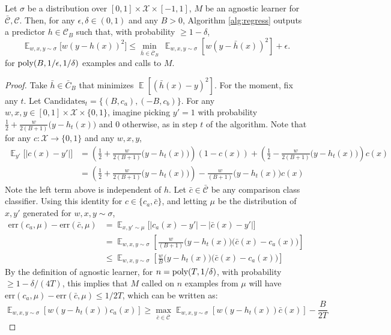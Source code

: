 \documentclass[final, 12pt]{colt2018} %
\newcommand{\eps}{\epsilon}
\newcommand{\E}{\mathop{\mathbb{E}}}
\newcommand{\err}{\mathrm{err}}
\def\calC{\mathcal{C}}
\def\calX{\mathcal{X}}
\newcommand{\poly}{\mathop{\mbox{\text{poly}}}}
\begin{document}
\begin{lemma}\label{lem:classification-to-regression}
Let $\sigma$ be a distribution over $[0,1]\times \calX \times [-1,1]$, $M$ be an agnostic learner for $\bar{\calC}, \calC$.
Then,  for any $\eps, \delta \in (0,1)$ and any $B>0$, Algorithm \ref{alg:regress} outputs a predictor $h \in \calC_B$ such that, with probability $\geq 1-\delta$, 
$$\E_{w,x,y\sim \sigma}\bigl[w(y-h(x))^2\bigr] \leq \min_{\bar{h} \in \bar{\calC}_B} ~\E_{w,x,y\sim \sigma}\left[w\left(y-\bar{h}(x)\right)^2\right]+\eps.$$
for $\poly(B, 1/\eps, 1/\delta)$ examples and calls to $M$.
\end{lemma}
\begin{proof}
Take $\bar{h}\in \bar{C}_B$ that minimizes $\E[(\bar{h}(x)-y)^2]$. 
For the moment, fix any $t$. Let $\mathrm{Candidates}_t=\{(B,c_a), (-B,c_b)\}$. For any $w,x,y\in [0,1] \times \calX \times\{0,1\}$, imagine picking $y'=1$ with probability $\frac{1}{2}+\frac{w}{2(B+1)}\bigl(y - h_t(x)\bigr)$ and 0 otherwise, as in step $t$ of the algorithm. Note that for any $c: \calX \rightarrow \{0,1\}$ and any $w,x,y$,
\begin{align*}
\E_{y'}\bigl[|c(x)-y'|\bigr]&=\left(\frac{1}{2}+\frac{w}{2(B+1)}\bigl(y - h_t(x)\bigr)\right)(1-c(x)) +
\left(\frac{1}{2}-\frac{w}{2(B+1)}\bigl(y - h_t(x)\bigr)\right)c(x)\\
&= \left(\frac{1}{2}+\frac{w}{2(B+1)}\bigl(y - h_t(x)\bigr)\right) - \frac{w}{(B+1)}\bigl(y - h_t(x)\bigr)c(x)
\end{align*}
Note the left term above is independent of $h$. Let ${\bar{c}}\in\bar{\calC}$ be any comparison class classifier. Using this identity for $c \in \{c_a,\bar{c}\}$, and letting $\mu$ be the distribution of $x,y'$ generated for $w,x,y\sim \sigma$, 
\begin{align*}
\err(c_a,\mu)-\err(\bar{c},\mu) &= 
\E_{x,y'\sim \mu}\bigl[|c_a(x)-y'|-|\bar{c}(x)-y'|\bigr]\\
&=\E_{w,x,y\sim \sigma}\left[\frac{w}{(B+1)}\bigl(y - h_t(x)\bigr)\bigl(\bar{c}(x)-c_a(x)\bigr)\right]\\
&\leq\E_{w,x,y\sim \sigma}\left[\frac{w}{B}\bigl(y - h_t(x)\bigr)\bigl(\bar{c}(x)-c_a(x)\bigr)\right]
\end{align*}
By the definition of agnostic learner, for $n = \poly(T, 1/\delta)$, with probability $\geq 1-\delta/(4T)$, this implies that $M$ called on $n$ examples from $\mu$ will have $\err(c_a,\mu)-\err(\bar{c},\mu)\leq 1/2T$, which can be written as:
\begin{equation}
\E_{w,x,y\sim \sigma}[w(y-h_t(x))c_{a}(x)]\geq \max_{\bar{c} \in \bar{\calC}} \E_{w,x,y\sim \sigma}[w(y-h_t(x))\bar{c}(x)] - \frac{B}{2T}\label{eq:yoyo}

\end{equation}
\end{proof}
\end{document}
